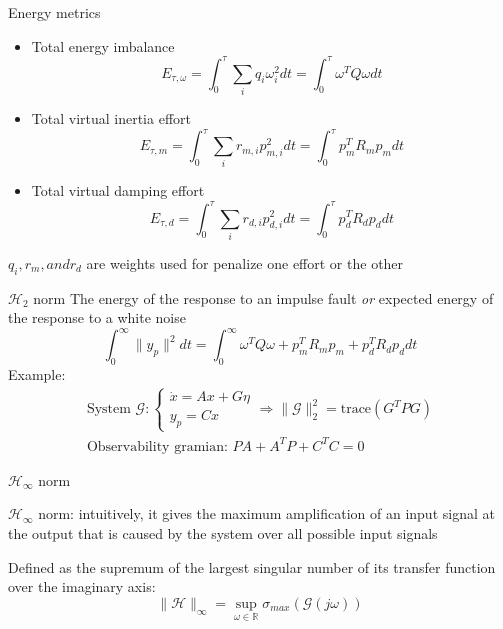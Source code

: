 \documentclass[aspectratio=169, 12pt]{beamer}
\begin{document}
\begin{frame}{Energy metrics}{}
  \begin{itemize}[<+(1)->]
      \item Total energy imbalance
      \begin{equation}
        E_{\tau,\omega}=\int_{0}^{\tau}\sum_{i} q_i\omega_i^{2}dt=\int_{0}^{\tau} \omega^T Q \omega dt
      \end{equation}
      
      \item Total virtual inertia effort
      \begin{equation}
        E_{\tau,m}=\int_{0}^{\tau}\sum_{i} r_{m,i}p_{m,i}^{2}dt=\int_{0}^{\tau} p_{m}^T R_m p_{m} dt
      \end{equation}

      \item Total virtual damping effort
      \begin{equation}
        E_{\tau,d}=\int_{0}^{\tau}\sum_{i} r_{d,i}p_{d,i}^{2}dt=\int_{0}^{\tau} p_{d}^T R_d p_{d} dt
      \end{equation}
    \end{itemize}

    $q_i, r_m, and r_d$ are weights used for penalize one effort or the other
\end{frame}

\begin{frame}{$\mathcal{H}_2$ norm}
  The energy of the response to an impulse fault \textit{or} expected energy of the response to a white noise
    \begin{equation}
      \int_{0}^{\infty}\| y_p \|^2 dt = \int_{0}^{\infty} \omega^T Q \omega + p_{m}^T R_m p_{m} + p_{d}^T R_d p_{d} dt
    \end{equation}
    \textcolor{NTNUViolet}{
    Example: 
    \begin{gather}
      \text{System } \mathcal{G} :
      \begin{cases}
        \dot{x} = A x + G \eta \\
        y_p = C x
      \end{cases}
      \Rightarrow \| \mathcal{G} \|_2^2=\text{trace}\left(G^T P G\right)\\
      \text{Observability gramian: } PA + A^TP+C^TC=0
    \end{gather} 
    }
\end{frame}

\begin{frame}{$\mathcal{H}_{\infty }$ norm}
  
  $\mathcal{H}_{\infty }$ norm: intuitively, it gives the maximum amplification of an input signal at the output that is caused by the system over all possible input signals

  Defined as the supremum of the largest singular number of its transfer function over the imaginary axis:
  \begin{equation}
    \| \mathcal{H} \|_{\infty}= \sup_{\omega \in \mathbb{R} } \sigma_{max}\left(\mathcal{G}\left(j\omega\right)\right)
  \end{equation}
  
\end{frame}
\end{document}
